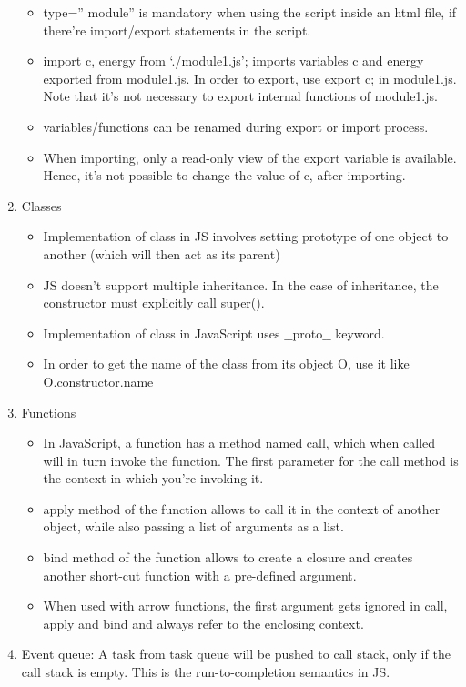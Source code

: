 \documentclass[a4paper]{article}
\begin{document}
\begin{enumerate}
   \begin{itemize}
       \item type=” module”  is mandatory when using the script inside an html file, if there’re import/export statements in the script.
       \item import {c, energy} from ‘./module1.js’; imports  variables c  and energy  exported  from module1.js. In order to export, use export c;  in module1.js. Note that it’s not necessary to export internal  functions of module1.js.
       \item variables/functions can be renamed during export or import  process.
       \item When importing, only a read-only view of the export variable is available. Hence, it’s not possible to change the value of c, after importing.
   \end{itemize}
   \item Classes
   \begin{itemize}
       \item Implementation of class in JS involves setting prototype  of one object to another (which will then act as its parent)
       \item JS doesn’t support multiple inheritance. In the case of inheritance, the constructor must explicitly call super().
       \item Implementation of class in JavaScript uses $\_\_$proto$\_\_$ keyword.
       \item In order to get the name of the class from its object O, use it like O.constructor.name
   \end{itemize}
   \item Functions
   \begin{itemize}
       \item In JavaScript, a function  has a method named call, which when called will in turn invoke  the function. The first parameter for the call method is the context  in which you’re invoking it. 
       \item apply method of the function allows to call it in the context of another object, while also passing a list of arguments as a list. 
       \item bind method of the function allows to create a closure and creates another short-cut function with a pre-defined argument.
       \item When used with arrow functions, the first argument gets ignored in call, apply and bind and always refer to the enclosing context.
   \end{itemize}
   \item Event queue: A task from task queue will be pushed to call stack, only if the call stack is empty. This is  the run-to-completion semantics in JS.
\end{enumerate}
\end{document}
